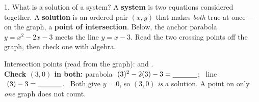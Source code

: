 \documentclass[10pt]{article}
\newcommand{\lgrid}[4]{%
  \draw[step=1, linegray!40, very thin] (#1,#3) grid (#2,#4);
  \draw[->, semithick, charcoal] (#1,0)--(#2,0) node[below right, font=\scriptsize]{$x$};
  \draw[->, semithick, charcoal] (0,#3)--(0,#4) node[left, font=\scriptsize]{$y$};}
\begin{document}
\begin{notesbox}{1. What is a solution of a system?}
A \textbf{system} is two equations considered together. A \textbf{solution} is an ordered pair $(x,y)$ that makes
\emph{both} true at once --- on the graph, a \textbf{point of intersection}. Below, the anchor parabola
$y=x^2-2x-3$ meets the line $y=x-3$. Read the two crossing points off the graph, then check one with algebra.
\begin{center}
\end{center}
Intersection points (read from the graph): \blank{2.2cm} and \blank{2.2cm}. \\[3pt]
\textbf{Check $(3,0)$ in both:} parabola $\ (3)^2-2(3)-3=\blank{1.2cm}$; \ line $\ (3)-3=\blank{1.2cm}$. \
Both give $y=0$, so $(3,0)$ \emph{is} a solution. A point on only \emph{one} graph does not count.
\end{notesbox}
\end{document}
